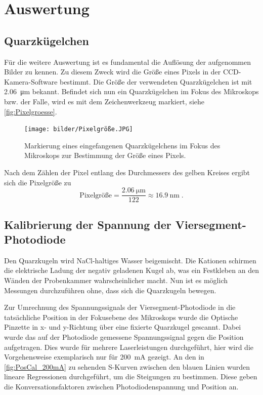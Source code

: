 \section{Auswertung}

\subsection{Quarzkügelchen}
    Für die weitere Auswertung ist es fundamental die Auflösung der aufgenommen Bilder zu kennen.
    Zu diesem Zweck wird die Größe eines Pixels in der CCD-Kamera-Software bestimmt.
    Die Größe der verwendeten Quarzkügelchen ist mit \qty{2,06}{\um} bekannt.
    Befindet sich nun ein Quarzkügelchen im Fokus des Mikroskops bzw. der Falle, wird es mit dem Zeichenwerkzeug markiert, siehe \autoref{fig:Pixelgroesse}.
    \begin{figure}[ht]
        \centering\captionsetup{format=plain}
        \texttt{[image: bilder/Pixelgröße.JPG]}
        \caption{Markierung eines eingefangenen Quarzkügelchens im Fokus des Mikroskops zur Bestimmung der Größe eines Pixels.}
        \label{fig:Pixelgroesse}
    \end{figure}
    \FloatBarrier
    Nach dem Zählen der Pixel entlang des Durchmessers des gelben Kreises ergibt sich die Pixelgröße zu
    \begin{equation}
        \mathrm{Pixelgröße} = \frac{\SI{2,06}{\um}}{122} \approx \SI{16,9}{\nm} \;.
    \end{equation}

\subsection{Kalibrierung der Spannung der Viersegment-Photodiode}
    Den Quarzkugeln wird NaCl-haltiges Wasser beigemischt.
    Die Kationen schirmen die elektrische Ladung der negativ geladenen Kugel ab, was ein Festkleben an den Wänden der Probenkammer wahrscheinlicher macht.
    Nun ist es möglich Messungen durchzuführen ohne, dass sich die Quarzkugeln bewegen.

    Zur Umrechnung des Spannungssignals der Viersegment-Photodiode in die tatsächliche Position in der Fokusebene des Mikroskops wurde die Optische Pinzette in x- und y-Richtung über eine fixierte Quarzkugel gescannt.
    Dabei wurde das auf der Photodiode gemessene Spannungssignal gegen die Position aufgetragen.
    Dies wurde für mehrere Laserleistungen durchgeführt, hier wird die Vorgehensweise exemplarisch nur für \qty{200}{mA} gezeigt.
    An den in \autoref{fig:PosCal_200mA} zu sehenden S-Kurven zwischen den blauen Linien wurden lineare Regressionen durchgeführt, um die Steigungen zu bestimmen.
    Diese geben die Konversationsfaktoren zwischen Photodiodenspannung und Position an.

